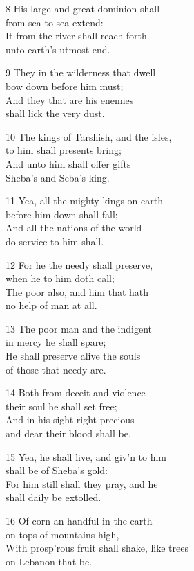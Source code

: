 8 His large and great dominion shall\\
from sea to sea extend:\\
It from the river shall reach forth\\
unto earth’s utmost end.

9 They in the wilderness that dwell\\
bow down before him must;\\
And they that are his enemies\\
shall lick the very dust.

10 The kings of Tarshish, and the isles,\\
to him shall presents bring;\\
And unto him shall offer gifts\\
Sheba’s and Seba’s king.

11 Yea, all the mighty kings on earth\\
before him down shall fall;\\
And all the nations of the world\\
do service to him shall.

12 For he the needy shall preserve,\\
when he to him doth call;\\
The poor also, and him that hath\\
no help of man at all.

13 The poor man and the indigent\\
in mercy he shall spare;\\
He shall preserve alive the souls\\
of those that needy are.

14 Both from deceit and violence\\
their soul he shall set free;\\
And in his sight right precious\\
and dear their blood shall be.

15 Yea, he shall live, and giv’n to him\\
shall be of Sheba’s gold:\\
For him still shall they pray, and he\\
shall daily be extolled.

16 Of corn an handful in the earth\\
on tops of mountains high,\\
With prosp’rous fruit shall shake, like trees\\
on Lebanon that be.

